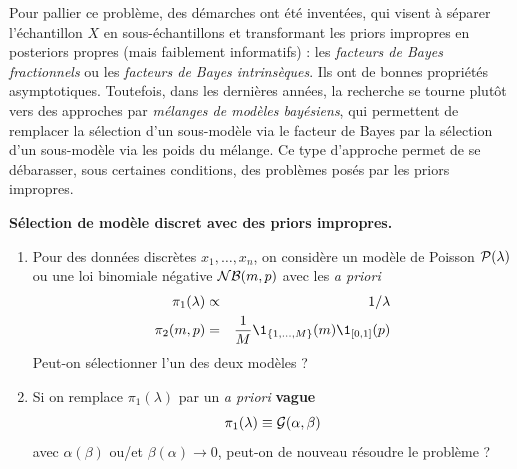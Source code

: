 Pour pallier ce problème, des démarches ont été inventées, qui visent à séparer l'échantillon $X$ en sous-échantillons et transformant les priors impropres en posteriors propres (mais faiblement informatifs) : les \emph{facteurs de Bayes fractionnels} ou les \emph{facteurs de Bayes intrinsèques}. Ils ont de bonnes propriétés asymptotiques. Toutefois, dans les dernières années, la recherche se tourne plutôt vers des approches par \emph{mélanges de modèles bayésiens}, qui permettent de remplacer la sélection d'un sous-modèle via le facteur de Bayes par la sélection d'un sous-modèle via les poids du mélange. Ce type d'approche permet de se débarasser, sous certaines conditions, des problèmes posés par les priors impropres.  \\

\begin{exec}{\bf Sélection de modèle discret avec des priors impropres.}
\begin{enumerate}
    \item Pour des données discrètes $x_1,\ldots,x_n$, on considère un modèle de Poisson ${\cal{P}}(\lambda)$ ou une loi binomiale négative ${\cal{NB}}(m,p)$ avec les {\it a priori} 
\begin{eqnarray*}
\pi_1(\lambda) & \propto & 1/\lambda \\
\pi_2(m,p) & = & \frac{1}{M} \1_{\{1,\ldots,M\}}(m) \1_{[0,1]}(p)
\end{eqnarray*}
Peut-on sélectionner l'un des deux modèles ?
\item Si on remplace $\pi_1(\lambda)$ par un {\it a priori} {\bf vague}
$$
\pi_1(\lambda)  \equiv  {\cal{G}}(\alpha,\beta)
$$
avec $\alpha(\beta)$ ou/et $\beta(\alpha) \to 0$, peut-on de nouveau résoudre le problème ? 
\end{enumerate}
\end{exec}

\if{} \vspace{1cm} 
\fi
\vspace{0.5cm}



\clearpage
 







